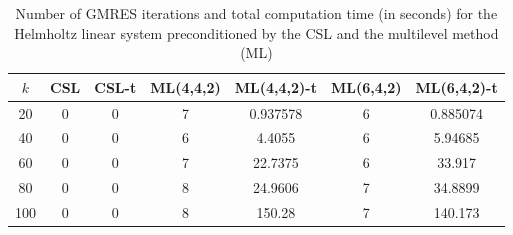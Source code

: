 \begin{table}[t]
\centering
\begin{tabular}{ccccccc}
\hline
$k$ & CSL & CSL-t & ML(4,4,2) & ML(4,4,2)-t& ML(6,4,2) & ML(6,4,2)-t \\ \hline
20 & 0 & 0 & 7 & 0.937578 & 6 & 0.885074 \\
40 & 0 & 0 & 6 & 4.4055 & 6 & 5.94685 \\
60 & 0 & 0 & 7 & 22.7375 & 6 & 33.917 \\
80 & 0 & 0 & 8 & 24.9606 & 7 & 34.8899 \\
100 & 0 & 0 & 8 & 150.28 & 7 & 140.173 \\
\hline
\end{tabular}
\caption{Number of GMRES iterations and total computation time (in seconds) for the Helmholtz linear system preconditioned by the  CSL and the multilevel method (ML)}
\label{table:mlgmres_csl_vs_adef_coarse_eps_20}
\end{table}
